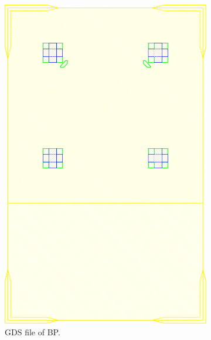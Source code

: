 \begin{figure}
    \centering
    \begin{subfigure}[t]{0.3\textwidth}
        \includegraphics[width=\textwidth]{Main/Ch4/ONOFF_NC_2022_V3.GDS_BP.pdf}
        \caption{GDS file of BP.}
        \label{fig:P3_GDS_BP}
    \end{subfigure}
    ~
    \begin{subfigure}[t]{0.3\textwidth}

\end{subfigure}
\end{figure}
